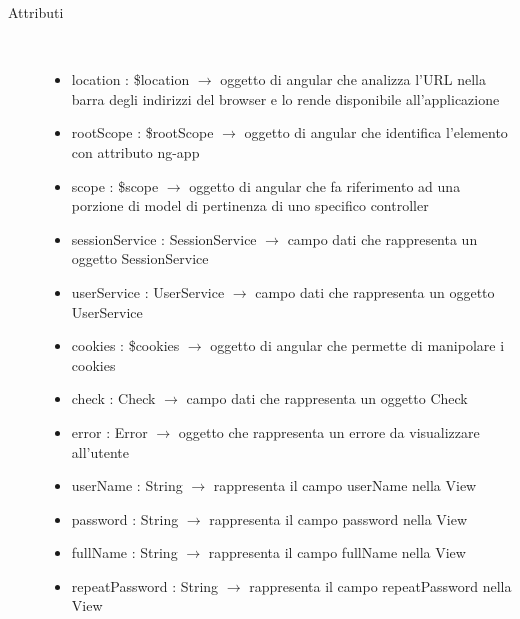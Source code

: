 \begin{description}
\item[Attributi] \hfill \\
\vspace{-7mm}
\begin{itemize}
	\item location : \$location $\rightarrow$ oggetto di angular che analizza l'URL nella barra degli indirizzi del browser e lo rende disponibile all'applicazione
	\item rootScope : \$rootScope $\rightarrow$ oggetto di angular che identifica l’elemento con attributo ng-app
	\item scope : \$scope $\rightarrow$ oggetto di angular che fa riferimento ad una porzione di model di pertinenza di uno specifico controller
	\item sessionService : SessionService $\rightarrow$ campo dati che rappresenta un oggetto SessionService
	\item userService : UserService $\rightarrow$ campo dati che rappresenta un oggetto UserService
	\item cookies : \$cookies $\rightarrow$ oggetto di angular che permette di manipolare i cookies
	\item check : Check $\rightarrow$ campo dati che rappresenta un oggetto Check
	\item error	 : Error	 $\rightarrow$ oggetto che rappresenta un errore da visualizzare all'utente
	\item userName : String $\rightarrow$ rappresenta il campo userName nella View
	\item password : String $\rightarrow$ rappresenta il campo password nella View
	\item fullName : String $\rightarrow$ rappresenta il campo fullName nella View
	\item repeatPassword : String $\rightarrow$ rappresenta il campo repeatPassword nella View
\end{itemize}


\end{description}
